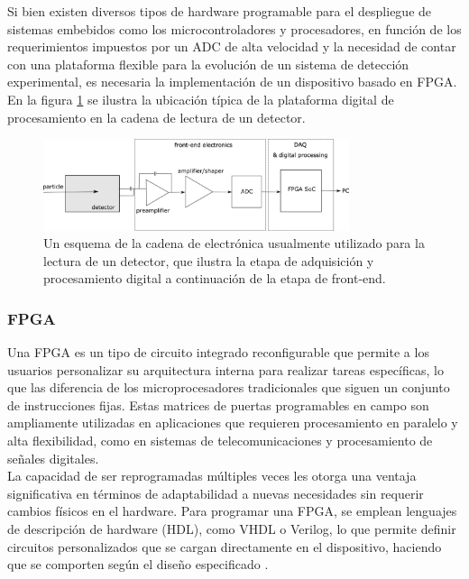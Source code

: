 \documentclass[]{book}
\begin{document}
\noindent Si bien existen diversos tipos de hardware programable para el despliegue de sistemas embebidos como los microcontroladores y procesadores, en función de los requerimientos impuestos por un ADC de alta velocidad y la necesidad de contar con una plataforma flexible para la evolución de un sistema de detección experimental, es necesaria la implementación de un dispositivo basado en FPGA. En la figura \ref{fig:pulse_chain} se ilustra la ubicación típica de la plataforma digital de procesamiento en la cadena de lectura de un detector.
\begin{figure}[h]
    \centering
    \includegraphics[width=0.8\textwidth]{pulse_chain_generic.png}
    \caption{Un esquema de la cadena de electrónica usualmente utilizado para la lectura de un
    detector, que ilustra la etapa de adquisición y procesamiento digital a continuación de la etapa de front-end.}
    \label{fig:pulse_chain}

\end{figure}

\subsubsection{FPGA}
\noindent Una FPGA es un tipo de circuito integrado reconfigurable que permite a los usuarios personalizar su arquitectura interna para realizar tareas específicas, lo que las diferencia de los microprocesadores tradicionales que siguen un conjunto de instrucciones fijas. Estas matrices de puertas programables en campo son ampliamente utilizadas en aplicaciones que requieren procesamiento en paralelo y alta flexibilidad, como en sistemas de telecomunicaciones y procesamiento de señales digitales. \\

\noindent La capacidad de ser reprogramadas múltiples veces les otorga una ventaja significativa en términos de adaptabilidad a nuevas necesidades sin requerir cambios físicos en el hardware. Para programar una FPGA, se emplean lenguajes de descripción de hardware (HDL), como VHDL o Verilog, lo que permite definir circuitos personalizados que se cargan directamente en el dispositivo, haciendo que se comporten según el diseño especificado \cite{brown2000fundamentals}.\\
\end{document}
